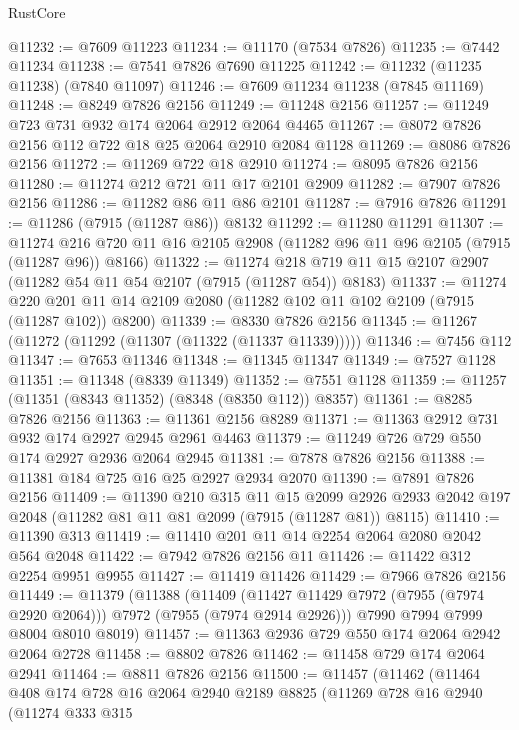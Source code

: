 \begin{lexlean}{RustCore}
\begin{coremodule}
@11232 := @7609 @11223
@11234 := @11170 (@7534 @7826)
@11235 := @7442 @11234
@11238 := @7541 @7826 @7690 @11225
@11242 := @11232 (@11235 @11238) (@7840 @11097)
@11246 := @7609 @11234 @11238 (@7845 @11169)
@11248 := @8249 @7826 @2156
@11249 := @11248 @2156
@11257 := @11249 @723 @731 @932 @174 @2064 @2912 @2064 @4465
@11267 := @8072 @7826 @2156 @112 @722 @18 @25 @2064 @2910 @2084 @1128
@11269 := @8086 @7826 @2156
@11272 := @11269 @722 @18 @2910
@11274 := @8095 @7826 @2156
@11280 := @11274 @212 @721 @11 @17 @2101 @2909
@11282 := @7907 @7826 @2156
@11286 := @11282 @86 @11 @86 @2101
@11287 := @7916 @7826
@11291 := @11286 (@7915 (@11287 @86)) @8132
@11292 := @11280 @11291
@11307 := @11274 @216 @720 @11 @16 @2105 @2908 (@11282 @96 @11 @96 @2105 (@7915 (@11287 @96)) @8166)
@11322 := @11274 @218 @719 @11 @15 @2107 @2907 (@11282 @54 @11 @54 @2107 (@7915 (@11287 @54)) @8183)
@11337 := @11274
    @220
    @201
    @11
    @14
    @2109
    @2080
    (@11282 @102 @11 @102 @2109 (@7915 (@11287 @102)) @8200)
@11339 := @8330 @7826 @2156
@11345 := @11267 (@11272 (@11292 (@11307 (@11322 (@11337 @11339)))))
@11346 := @7456 @112
@11347 := @7653 @11346
@11348 := @11345 @11347
@11349 := @7527 @1128
@11351 := @11348 (@8339 @11349)
@11352 := @7551 @1128
@11359 := @11257 (@11351 (@8343 @11352) (@8348 (@8350 @112)) @8357)
@11361 := @8285 @7826 @2156
@11363 := @11361 @2156 @8289
@11371 := @11363 @2912 @731 @932 @174 @2927 @2945 @2961 @4463
@11379 := @11249 @726 @729 @550 @174 @2927 @2936 @2064 @2945
@11381 := @7878 @7826 @2156
@11388 := @11381 @184 @725 @16 @25 @2927 @2934 @2070
@11390 := @7891 @7826 @2156
@11409 := @11390
    @210
    @315
    @11
    @15
    @2099
    @2926
    @2933
    @2042
    @197
    @2048
    (@11282 @81 @11 @81 @2099 (@7915 (@11287 @81)) @8115)
@11410 := @11390 @313
@11419 := @11410 @201 @11 @14 @2254 @2064 @2080 @2042 @564 @2048
@11422 := @7942 @7826 @2156 @11
@11426 := @11422 @312 @2254 @9951 @9955
@11427 := @11419 @11426
@11429 := @7966 @7826 @2156
@11449 := @11379
    (@11388
      (@11409 (@11427 @11429 @7972 (@7955 (@7974 @2920 @2064))) @7972 (@7955 (@7974 @2914 @2926)))
      @7990
      @7994
      @7999
      @8004
      @8010
      @8019)
@11457 := @11363 @2936 @729 @550 @174 @2064 @2942 @2064 @2728
@11458 := @8802 @7826
@11462 := @11458 @729 @174 @2064 @2941
@11464 := @8811 @7826 @2156
@11500 := @11457
    (@11462
      (@11464
        @408
        @174
        @728
        @16
        @2064
        @2940
        @2189
        @8825
        (@11269
          @728
          @16
          @2940
          (@11274
            @333
            @315

\end{coremodule}
\end{lexlean}
